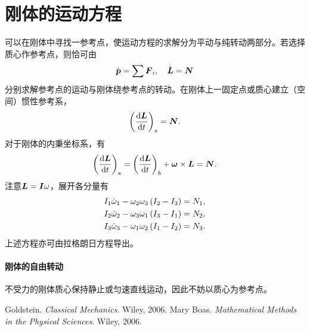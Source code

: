 \documentclass{ctexrep}
\begin{document}
\chapter{刚体的运动方程}
可以在刚体中寻找一参考点，使运动方程的求解分为平动与纯转动两部分。若选择质心作参考点，则恰可由
\[ \dot{\boldsymbol{p}} = \sum \boldsymbol{F}_i, \quad \dot{\boldsymbol{L}} = \boldsymbol{N} \]
分别求解参考点的运动与刚体绕参考点的转动。在刚体上一固定点或质心建立（空间）惯性参考系，
\[ \left(\frac{\mathrm{d} \boldsymbol{L}}{\mathrm{d} t}\right)_s = \boldsymbol{N}. \]
对于刚体的内秉坐标系，有
\[ \left(\frac{\mathrm{d} \boldsymbol{L}}{\mathrm{d} t}\right)_s = \left(\frac{\mathrm{d} \boldsymbol{L}}{\mathrm{d} t}\right)_b+\boldsymbol{\omega}\times\boldsymbol{L} = \boldsymbol{N}. \]
注意$\boldsymbol{L}=\boldsymbol{I}\omega$，展开各分量有
\begin{align*}
I_1\dot{\omega}_1-\omega_2\omega_3\left(I_2-I_3\right)&=N_1,\\
I_2\dot{\omega}_2-\omega_3\omega_1\left(I_3-I_1\right)&=N_2,\\
I_3\dot{\omega}_3-\omega_1\omega_2\left(I_1-I_2\right)&=N_3.
\end{align*}
上述方程亦可由拉格朗日方程导出。
\subsubsection{刚体的自由转动}
不受力的刚体质心保持静止或匀速直线运动，因此不妨以质心为参考点。

\begin{thebibliography}{9}
Goldstein.
\textit{Classical Mechanics}. 
Wiley, 2006.
Mary Boas.
\textit{Mathematical Methods in the Physical Sciences}. 
Wiley, 2006.
\end{thebibliography}
\end{document}
